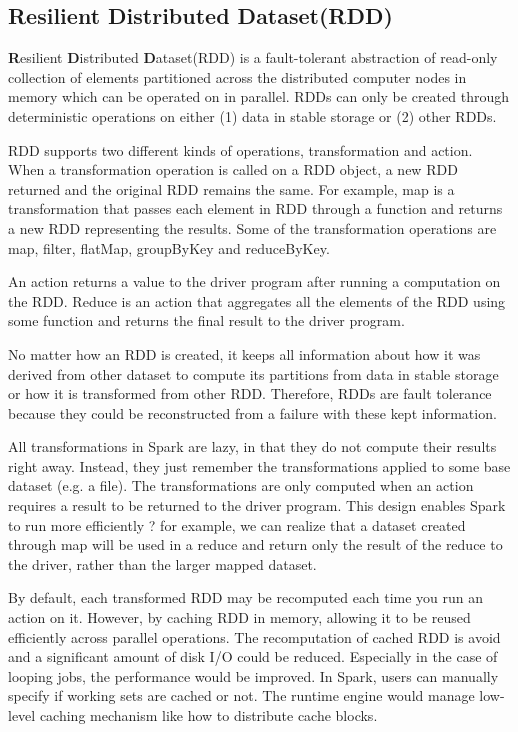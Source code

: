 \subsection{ Resilient Distributed Dataset(RDD)}

\textbf{R}esilient \textbf{D}istributed \textbf{D}ataset(RDD) is a fault-tolerant abstraction of read-only collection of elements partitioned across the distributed computer nodes in memory which can be operated on in parallel. RDDs can only be created through deterministic operations on either (1) data in stable storage or (2) other RDDs\cite{zaharia2012resilient}. 

RDD supports two different kinds of operations, transformation and action.  When a transformation operation is called on a RDD object, a new RDD returned and the original RDD remains the same. For example, map is a transformation that passes each element in RDD through a function and returns a new RDD representing the results. Some of the transformation operations are  map, filter, flatMap, groupByKey and reduceByKey. 

An action returns a value to the driver program after running a computation on the RDD. Reduce is an action that aggregates all the elements of the RDD using some function and returns the final result to the driver program.

No matter how an RDD is created, it keeps all information about how it was derived from other dataset to compute its partitions from data in stable storage or how it is transformed from other RDD. Therefore, RDDs are fault tolerance because they could be reconstructed from a failure with these kept information. 

All transformations in Spark are lazy, in that they do not compute their results right away. Instead, they just remember the transformations applied to some base dataset (e.g. a file). The transformations are only computed when an action requires a result to be returned to the driver program. This design enables Spark to run more efficiently ? for example, we can realize that a dataset created through map will be used in a reduce and return only the result of the reduce to the driver, rather than the larger mapped dataset.

By default, each transformed RDD may be recomputed each time you run an action on it. However, by caching RDD in memory, allowing it to be reused efficiently across parallel operations. The recomputation of cached RDD is avoid  and a significant amount of disk I/O could be reduced. Especially in the case of looping jobs, the performance would be improved. In Spark, users can manually specify if working sets are cached or not. The runtime engine would manage low-level caching mechanism like how to distribute cache blocks.

